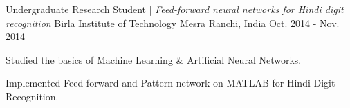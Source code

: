 \begin{cventries}
  \cventry
    {Undergraduate Research Student | \textit{Feed-forward neural networks for Hindi digit recognition}}
    {Birla Institute of Technology Mesra}
    {Ranchi, India}
    {Oct. 2014 - Nov. 2014}
    {
      \begin{cvitems}
        \item {Studied the basics of Machine Learning \& Artificial Neural Networks.}
        \item {Implemented Feed-forward and Pattern-network on MATLAB for Hindi Digit Recognition.}
      \end{cvitems}
    }
    
\end{cventries}
